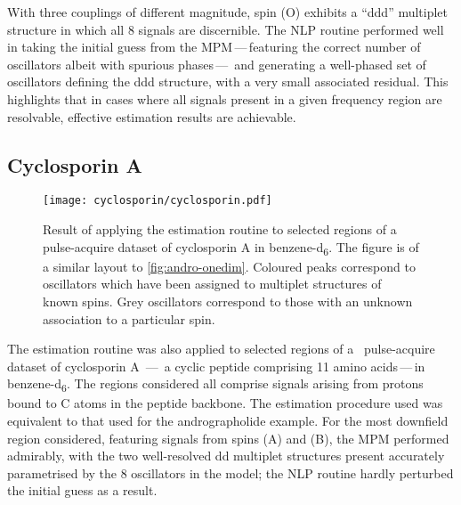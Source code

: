 With three couplings of different magnitude, spin (O) exhibits a ``ddd''
multiplet structure in which all 8 signals are discernible. The \ac{NLP}
routine performed well in taking the initial guess from the
\ac{MPM}\,---\,featuring the correct number of oscillators albeit with
spurious phases\,---\, and generating a well-phased set of oscillators defining
the ddd structure, with a very small associated residual. This highlights that
in cases where all signals present in a given frequency region are resolvable,
effective estimation results are achievable.

\subsection{Cyclosporin A}
\label{subsec:cyclo}
\begin{figure}
    \texttt{[image: cyclosporin/cyclosporin.pdf]}
    \caption[
        Result of applying the estimation routine to selected regions of a
        pulse-acquire dataset of cyclosporin A.
    ]{
        Result of applying the estimation routine to selected regions of a
        pulse-acquire dataset of cyclosporin A in benzene-d\textsubscript{6}.
        The figure is of a similar layout to \cref{fig:andro-onedim}.
        Coloured peaks correspond to oscillators which have been assigned
        to multiplet structures of known spins. Grey oscillators correspond to
        those with an unknown association to a particular spin.
    }
    \label{fig:cyclosporin}
\end{figure}
The estimation routine was also applied to selected regions of a
\proton\ pulse-acquire dataset of cyclosporin A \,---\, a cyclic peptide comprising 11 amino acids\,---\,in
benzene-d\textsubscript{6}.
The regions considered all comprise
signals arising from protons bound to C\textsuperscript{\textalpha} atoms in
the peptide backbone\cite{Verma2018}.
The estimation procedure used was equivalent to
that used for the andrographolide example. For the most downfield region
considered, featuring signals from spins (A) and (B), the \ac{MPM} performed
admirably, with the two well-resolved dd multiplet structures present
accurately parametrised by the 8 oscillators in the model; the \ac{NLP} routine
hardly perturbed the initial guess as a result.

